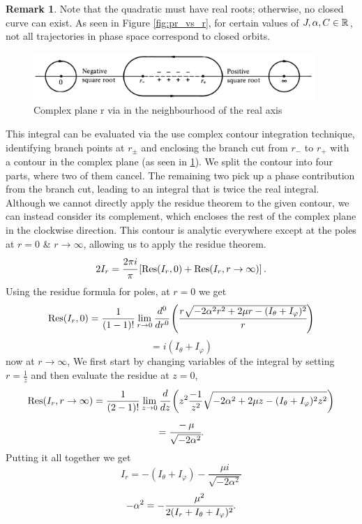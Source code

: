 \documentclass[12pt,oneside]{report}
\theoremstyle{definition}
\newtheorem{remark}{Remark}
\begin{document}
\begin{remark}
    Note that the quadratic must have real roots; otherwise, no closed curve can exist. As seen in Figure \ref{fig:pr_vs_r}, for certain values of $J,\alpha,C \in \mathbb{R}$, not all trajectories in phase space correspond to closed orbits.
\end{remark}
\begin{figure}[htbp]
    \centering
    \includegraphics[width=0.95\textwidth]{figures/poles2.png}
    \caption{Complex plane r via in the neighbourhood of the real axis \cite{goldstein2002classical}}
    \label{Complex plane r}
\end{figure}
This integral can be evaluated via the use complex contour integration technique, identifying branch points at $r_{\pm}$ and enclosing the branch cut from $r_{-}$ to $r_{+}$ with a contour in the complex plane (as seen in \ref{Complex plane r}). We split the contour into four parts, where two of them cancel. The remaining two pick up a phase contribution from the branch cut, leading to an integral that is twice the real integral. Although we cannot directly apply the residue theorem to the given contour, we can instead consider its complement, which encloses the rest of the complex plane in the clockwise direction. This contour is analytic everywhere except at the poles at $r=0$ \& $r \rightarrow \infty$, allowing us to apply the residue theorem.
$$ 2I_{r} = \cfrac{2\pi i}{\pi} \left[ \text{Res}(I_{r},0) + \text{Res}(I_{r}, r\rightarrow \infty)\right].$$
  Using the residue formula for poles, at $r=0$ we get
$$ \text{Res}(I_{r},0) = \frac{1}{(1-1)!}\lim_{r\rightarrow 0} \cfrac{d^{0}}{dr^{0}} \left( {\cfrac{r\sqrt{-2\alpha^{2}r^{2}+2 \mu r -(I_{\theta}+I_{\varphi})^{2}}}{r}} \right)$$
$$ = i(I_{\theta} + I_{\varphi})$$
now at $r \rightarrow \infty$,
We first start by changing variables of the integral by setting $r = \frac{1}{z}$ and then evaluate the residue at $z = 0$,
$$ \text{Res}(I_{r},r \rightarrow \infty) = \frac{1}{(2-1)!}\lim_{z\rightarrow 0} \cfrac{d}{dz} \left( z^{2} \frac{-1}{z^{2}} \sqrt{-2\alpha^{2}+2\mu z -(I_{\theta}+I_{\varphi})^{2}z^{2}}  \right)$$
$$ = \cfrac{-\mu}{\sqrt{-2\alpha^{2}}}.$$
Putting it all together we get
$$  I_{r} = -(I_{\theta}+I_{\varphi}) -\frac{\mu i}{\sqrt{-2\alpha^{2}}} $$
$$ -\alpha^{2} = -\cfrac{\mu^{2}}{2(I_{r}+I_{\theta}+I_{\varphi})^{2}}.$$
\end{document}
